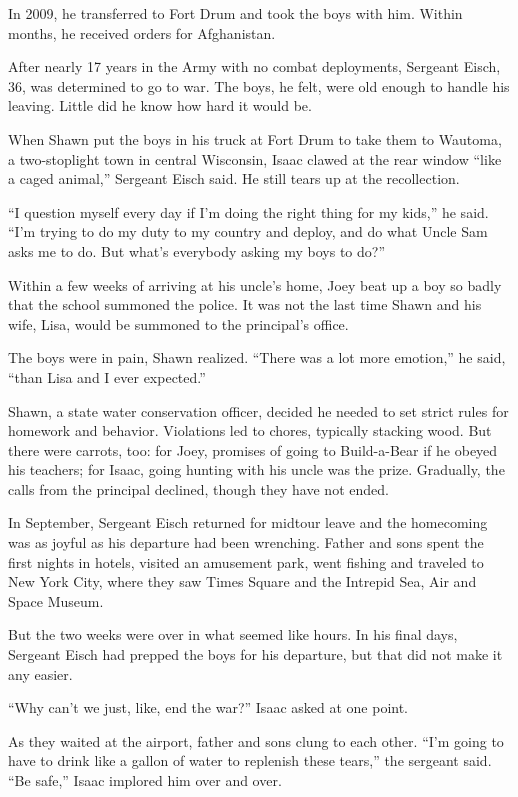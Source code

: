 ﻿\documentclass[12pt]{article}
\begin{document}
In 2009, he transferred to Fort Drum and took the boys with him. Within months, he received orders
for Afghanistan.

After nearly 17 years in the Army with no combat deployments, Sergeant Eisch, 36, was determined to
go to war. The boys, he felt, were old enough to handle his leaving. Little did he know how hard it
would be.

When Shawn put the boys in his truck at Fort Drum to take them to Wautoma, a two-stoplight town in
central Wisconsin, Isaac clawed at the rear window ``like a caged animal,'' Sergeant Eisch said. He
still tears up at the recollection.

``I question myself every day if I'm doing the right thing for my kids,'' he said. ``I'm trying to
do my duty to my country and deploy, and do what Uncle Sam asks me to do. But what's everybody
asking my boys to do?''

Within a few weeks of arriving at his uncle's home, Joey beat up a boy so badly that the school
summoned the police. It was not the last time Shawn and his wife, Lisa, would be summoned to the
principal's office.

The boys were in pain, Shawn realized. ``There was a lot more emotion,'' he said, ``than Lisa and I
ever expected.''

Shawn, a state water conservation officer, decided he needed to set strict rules for homework and
behavior. Violations led to chores, typically stacking wood. But there were carrots, too: for Joey,
promises of going to Build-a-Bear if he obeyed his teachers; for Isaac, going hunting with his uncle
was the prize. Gradually, the calls from the principal declined, though they have not ended.

In September, Sergeant Eisch returned for midtour leave and the homecoming was as joyful as his
departure had been wrenching. Father and sons spent the first nights in hotels, visited an amusement
park, went fishing and traveled to New York City, where they saw Times Square and the Intrepid Sea,
Air and Space Museum.

But the two weeks were over in what seemed like hours. In his final days, Sergeant Eisch had prepped
the boys for his departure, but that did not make it any easier.

``Why can't we just, like, end the war?'' Isaac asked at one point.

As they waited at the airport, father and sons clung to each other. ``I'm going to have to drink
like a gallon of water to replenish these tears,'' the sergeant said. ``Be safe,'' Isaac implored
him over and over.
\end{document}
